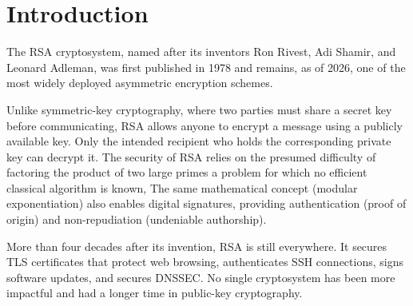 \chapter*{Introduction}

The RSA cryptosystem, named after its inventors Ron Rivest, Adi Shamir, and Leonard Adleman, was first published in 1978 and remains, as of 2026, one of the most widely deployed asymmetric encryption schemes.

Unlike symmetric-key cryptography, where two parties must share a secret key before communicating, RSA allows anyone to encrypt a message using a publicly available key. Only the intended recipient who holds the corresponding private key can decrypt it. The security of RSA relies on the presumed difficulty of factoring the product of two large primes a problem for which no efficient classical algorithm is known, The same mathematical concept (modular exponentiation) also enables digital signatures, providing authentication (proof of origin) and non-repudiation (undeniable authorship).


More than four decades after its invention, RSA is still everywhere. It secures TLS certificates that protect web browsing, authenticates SSH connections, signs software updates, and secures DNSSEC. No single cryptosystem has been more impactful and had a longer time in public-key cryptography.